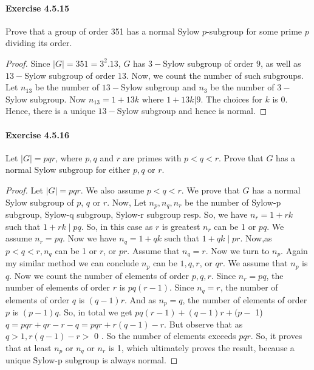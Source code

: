 \documentclass{article}
\theoremstyle{definition}
\begin{document}
\paragraph{Exercise 4.5.15} Prove that a group of order 351 has a normal Sylow $p$-subgroup for some prime $p$ dividing its order.
\begin{proof}
    Since $|G|=351=3^{2}.13$, $G$ has $3-$Sylow subgroup of order $9$, as well as $13-$Sylow subgroup of order $13$. Now, we count the number of such subgroups. Let $n_{13}$ be the number of $13-$Sylow subgroup and $n_{3}$ be the number of  $3-$Sylow subgroup. Now $n_{13}=1+13k$ where $1+13k|9$. The choices for $k$ is $0$. Hence, there is a unique $13-$Sylow subgroup and hence is normal.
\end{proof}



\paragraph{Exercise 4.5.16} Let $|G|=p q r$, where $p, q$ and $r$ are primes with $p<q<r$. Prove that $G$ has a normal Sylow subgroup for either $p, q$ or $r$.
\begin{proof}
    Let $|G|=p q r$. We also assume $p<q<r$. We prove that $G$ has a normal Sylow subgroup of $p$, $q$ or $r$. Now, Let $n_p, n_q, n_r$ be the number of Sylow-p subgroup, Sylow-q subgroup, Sylow-r subgroup resp. So, we have $n_r=1+r k$ such that $1+r k \mid p q$. So, in this case as $r$ is greatest $n_r$ can be 1 or $p q$. We assume $n_r=p q$. Now we have $n_q=1+q k$ such that $1+q k \mid p r$. Now,as $p<q<r, n_q$ can be 1 or $r$, or $p r$. Assume that $n_q=r$. Now we turn to $n_p$. Again my similar method we can conclude $n_p$ can be $1, q, r$, or $q r$. We assume that $n_p$ is $q$. Now we count the number of elements of order $p, q, r$. Since $n_r=p q$, the number of elements of order $r$ is $p q(r-1)$. Since $n_q=r$, the number of elements of order $q$ is $(q-1) r$. And as $n_p=q$, the number of elements of order $p$ is $(p-1) q$. So, in total we get $p q(r-1)+(q-1) r+(p-$ 1) $q=p q r+q r-r-q=p q r+r(q-1)-r$. But observe that as $q>1, r(q-1)-r>$ 0 . So the number of elements exceeds $p q r$. So, it proves that at least $n_p$ or $n_q$ or $n_r$ is 1, which ultimately proves the result, because a unique Sylow-p subgroup is always normal.
\end{proof}
\end{document}
